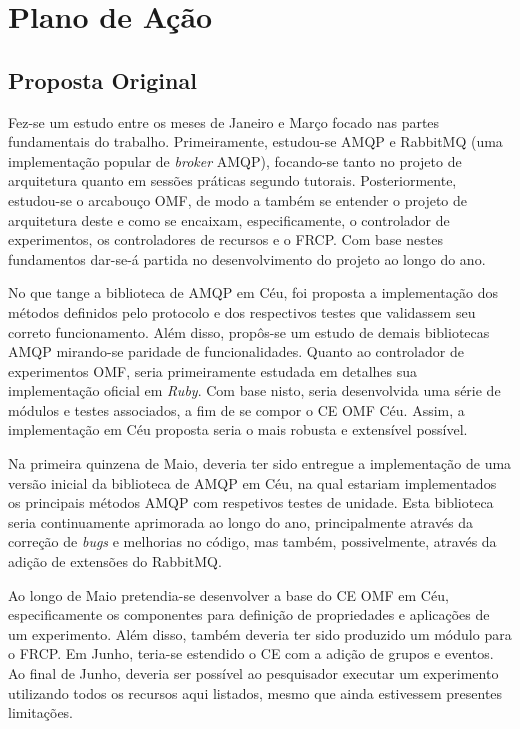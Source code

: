 
\chapter{Plano de A\c{c}\~ao}

\section{Proposta Original}

Fez-se um estudo entre os meses de Janeiro e Março focado nas partes fundamentais do trabalho. Primeiramente, estudou-se AMQP e RabbitMQ (uma implementa\c{c}\~ao popular de \textit{broker} AMQP), focando-se tanto no projeto de arquitetura quanto em sessões pr\'aticas segundo tutorais. Posteriormente, estudou-se o arcabou\c{c}o OMF, de modo a tamb\'em se entender o projeto de arquitetura deste e como se encaixam, especificamente, o controlador de experimentos, os controladores de recursos e o FRCP. Com base nestes fundamentos dar-se-\'a partida no desenvolvimento do projeto ao longo do ano.

No que tange a biblioteca de AMQP em C\'eu, foi proposta a implementação dos m\'etodos definidos pelo protocolo e dos respectivos testes que validassem seu correto funcionamento. Al\'em disso, propôs-se um estudo de demais bibliotecas AMQP mirando-se paridade de funcionalidades. Quanto ao controlador de experimentos OMF, seria primeiramente estudada em detalhes sua implementa\c{c}\~ao oficial em \textit{Ruby}. Com base nisto, seria desenvolvida uma s\'erie de m\'odulos e testes associados, a fim de se compor o CE OMF C\'eu. Assim, a implementa\c{c}\~ao em C\'eu proposta seria o mais robusta e extens\'ivel poss\'ivel.

Na primeira quinzena de Maio, deveria ter sido entregue a implementa\c{c}\~ao de uma vers\~ao inicial da biblioteca de AMQP em C\'eu, na qual estariam implementados os principais m\'etodos AMQP com respetivos testes de unidade. Esta biblioteca seria continuamente aprimorada ao longo do ano, principalmente atrav\'es da corre\c{c}\~ao de \textit{bugs} e melhorias no c\'odigo, mas tamb\'em, possivelmente, atrav\'es da adi\c{c}\~ao de extens\~oes do RabbitMQ.

Ao longo de Maio pretendia-se desenvolver a base do CE OMF em C\'eu, especificamente os componentes para defini\c{c}\~ao de propriedades e aplica\c{c}\~oes de um experimento. Al\'em disso, tamb\'em deveria ter sido produzido um m\'odulo para o FRCP. Em Junho, teria-se estendido o CE com a adi\c{c}\~ao de grupos e eventos. Ao final de Junho, deveria ser poss\'ivel ao pesquisador executar um experimento utilizando todos os recursos aqui listados, mesmo que ainda estivessem presentes limita\c{c}\~oes.


